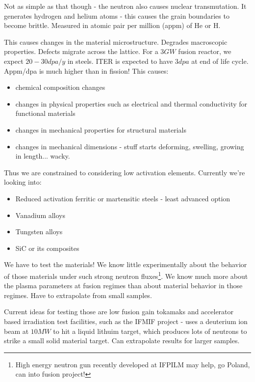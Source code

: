 \documentclass[PlasmaNotes.tex]{subfiles}
\begin{document}
Not as simple as that though - the neutron also causes nuclear transmutation. It generates hydrogen and helium atoms - this causes the grain boundaries to become brittle. Measured in atomic pair per million (appm) of He or H.

This causes changes in the material microstructure. Degrades macroscopic properties. Defects migrate across the lattice. For a $3 GW$ fusion reactor, we expect $20-30 dpa/y$ in steels. ITER is expected to have $3dpa$ at end of life cycle. Appm/dpa is much higher than in fission! This causes:
\begin{itemize}
 \item chemical composition changes
 \item changes in physical properties such as electrical and thermal conductivity for functional materials
 \item changes in mechanical properties for structural materials
 \item changes in mechanical dimensions - stuff starts deforming, swelling, growing in length... wacky.
\end{itemize}

Thus we are constrained to considering low activation elements. Currently we're looking into:
\begin{itemize}
 \item Reduced activation ferritic or martensitic steels - least advanced option
 \item Vanadium alloys
 \item Tungsten alloys
 \item SiC or its composites
\end{itemize}

We have to test the materials! We know little experimentally about the behavior of those materials under such strong neutron fluxes\footnote{High energy neutron gun recently developed at IFPILM may help, go Poland, can into fusion project!}. We know much more about the plasma parameters at fusion regimes than about material behavior in those regimes. Have to extrapolate from small samples.

Current ideas for testing those are low fusion gain tokamaks and accelerator based irradiation test facilities, such as the IFMIF project - uses a deuterium ion beam at $10 MW$ to hit a liquid lithuim target, which produces lots of neutrons to strike a small solid material target. Can extrapolate results for larger samples.
\end{document}
